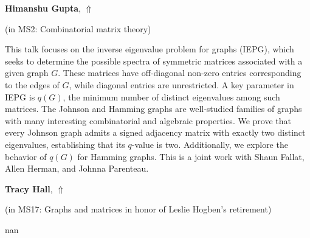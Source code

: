 \documentclass[ILAS2025-program.tex]{subfiles}
\begin{document}
\hypertarget{down0264}{}\begin{ilasabstract}
    
\textbf{Himanshu Gupta},  \hfill \hyperlink{up0264}{$\Uparrow$}
    
    
(in {\color{mstitle}MS2: Combinatorial matrix theory})
        
\mtskip
    This talk focuses on the inverse eigenvalue problem for graphs (IEPG), which seeks to determine the possible spectra of symmetric matrices associated with a given graph $G$. These matrices have off-diagonal non-zero entries corresponding to the edges of $G$, while diagonal entries are unrestricted. A key parameter in IEPG is $q(G)$, the minimum number of distinct eigenvalues among such matrices. The Johnson and Hamming graphs are well-studied families of graphs with many interesting combinatorial and algebraic properties. We prove that every Johnson graph admits a signed adjacency matrix with exactly two distinct eigenvalues, establishing that its $q$-value is two. Additionally, we explore the behavior of $q(G)$ for Hamming graphs. This is a joint work with Shaun Fallat, Allen Herman, and Johnna Parenteau. 

\end{ilasabstract}
    

\hypertarget{down0377}{}\begin{ilasabstract}
    
\textbf{Tracy Hall},  \hfill \hyperlink{up0377}{$\Uparrow$}
    
    
(in {\color{mstitle}MS17: Graphs and matrices in honor of Leslie Hogben's retirement})
        
\mtskip
    nan
\end{ilasabstract}
    
\end{document}
